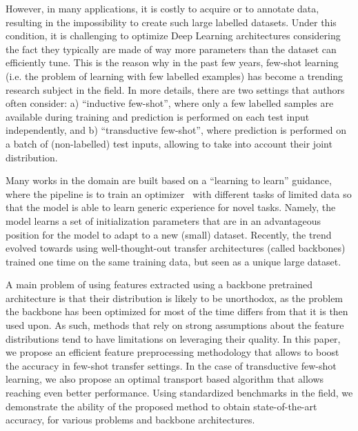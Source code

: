 \documentclass[review]{elsarticle}
\begin{document}
However, in many applications, it is costly to acquire or to annotate data, resulting in the impossibility to create such large labelled datasets. Under this condition, it is challenging to optimize Deep Learning architectures considering the fact they typically are made of way more parameters than the dataset can efficiently tune. This is the reason why in the past few years, few-shot learning (i.e. the problem of learning with few labelled examples) has become a trending research subject in the field. In more details, there are two settings that authors often consider: a) ``inductive few-shot'', where only a few labelled samples are available during training and prediction is performed on each test input independently, and b) ``transductive few-shot'', where prediction is performed on a batch of (non-labelled) test inputs, allowing to take into account their joint distribution.

Many works in the domain are built based on a ``learning to learn'' guidance, where the pipeline is to train an optimizer~\cite{finn2017model, DBLP:conf/iclr/RaviL17, thrun2012learning} with different tasks of limited data so that the model is able to learn generic experience for novel tasks. Namely, the model learns a set of initialization parameters that are in an advantageous position for the model to adapt to a new (small) dataset. Recently, the trend evolved towards using well-thought-out transfer architectures (called backbones)~\cite{torrey2010transfer, DBLP:journals/tip/DasL20, DBLP:conf/iclr/ChenLKWH19, mangla2020charting, hu2021graph, hu2021leveraging} trained one time on the same training data, but seen as a unique large dataset.

A main problem of using features extracted using a backbone pretrained architecture is that their distribution is likely to be unorthodox, as the problem the backbone has been optimized for most of the time differs from that it is then used upon. As such, methods that rely on strong assumptions about the feature distributions tend to have limitations on leveraging their quality. In this paper, we propose an efficient feature preprocessing methodology that allows to boost the accuracy in few-shot transfer settings. In the case of transductive few-shot learning, we also propose an optimal transport based algorithm that allows reaching even better performance. Using standardized benchmarks in the field, we demonstrate the ability of the proposed method to obtain state-of-the-art accuracy, for various problems and backbone architectures.
\end{document}
